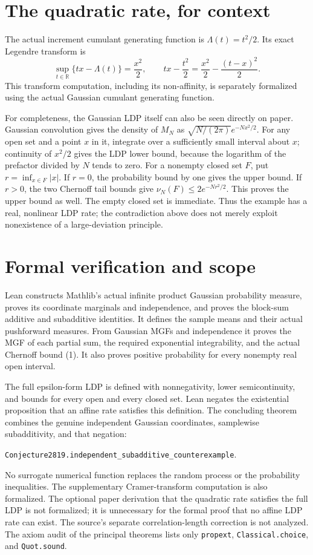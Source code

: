 \documentclass[11pt]{article}
\begin{document}
\section*{The quadratic rate, for context}
The actual increment cumulant generating function is $\Lambda(t)=t^2/2$.
Its exact Legendre transform is
\[
 \sup_{t\in\mathbb R}\{tx-\Lambda(t)\}
 =\frac{x^2}{2},
 \qquad tx-\frac{t^2}{2}
 =\frac{x^2}{2}-\frac{(t-x)^2}{2}.
\]
This transform computation, including its non-affinity, is separately
formalized using the actual Gaussian cumulant generating function.

For completeness, the Gaussian LDP itself can also be seen directly
on paper. Gaussian convolution gives the density of $M_N$ as
$\sqrt{N/(2\pi)}e^{-Nx^2/2}$. For any open set and a point $x$ in
it, integrate over a sufficiently small interval about $x$; continuity
of $x^2/2$ gives the LDP lower bound, because the logarithm of the
prefactor divided by $N$ tends to zero. For a nonempty closed set
$F$, put $r=\inf_{x\in F}|x|$. If $r=0$, the probability bound by one
gives the upper bound. If $r>0$, the two Chernoff tail bounds give
$\nu_N(F)\leq2e^{-Nr^2/2}$. This proves the upper bound as well.
The empty closed set is immediate. Thus the example has a real,
nonlinear LDP rate; the contradiction above does not merely exploit
nonexistence of a large-deviation principle.

\section*{Formal verification and scope}
Lean constructs Mathlib's actual infinite product Gaussian probability
measure, proves its coordinate marginals and independence, and proves
the block-sum additive and subadditive identities. It defines the
sample means and their actual pushforward measures. From Gaussian
MGFs and independence it proves the MGF of each partial sum, the
required exponential integrability, and the actual Chernoff bound (1).
It also proves positive probability for every nonempty real open interval.

The full epsilon-form LDP is defined with nonnegativity, lower
semicontinuity, and bounds for every open and every closed set.
Lean negates the existential proposition that an affine rate satisfies
this definition. The concluding theorem combines the genuine independent
Gaussian coordinates, samplewise subadditivity, and that negation:
\begin{center}\small
\texttt{Conjecture2819.independent\_subadditive\_counterexample}.
\end{center}
No surrogate numerical function replaces the random process or the
probability inequalities. The supplementary Cramer-transform computation
is also formalized. The optional paper derivation that the quadratic
rate satisfies the full LDP is not formalized; it is unnecessary for
the formal proof that no affine LDP rate can exist. The source's separate
correlation-length correction is not analyzed. The axiom audit of the
principal theorems lists only \texttt{propext}, \texttt{Classical.choice},
and \texttt{Quot.sound}.
\end{document}
